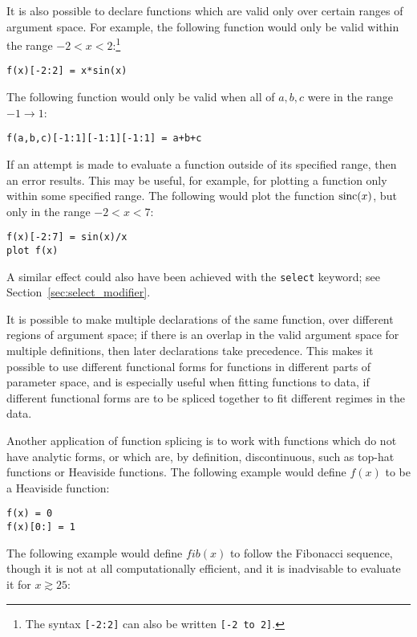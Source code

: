 \noindent It is also possible to declare functions which are valid only over
certain ranges of argument space. For example, the following function would
only be valid within the range $-2<x<2$:\footnote{The syntax {\tt [-2:2]} can
also be written {\tt [-2 to 2]}.}

\begin{verbatim}
f(x)[-2:2] = x*sin(x)
\end{verbatim}

\noindent The following function would only be valid when all of ${a,b,c}$ were
in the range $-1 \to 1$:

\begin{verbatim}
f(a,b,c)[-1:1][-1:1][-1:1] = a+b+c
\end{verbatim}

If an attempt is made to evaluate a function outside of its specified range,
then an error results. This may be useful, for example, for plotting a function
only within some specified range. The following would plot the function
${\rm sinc}(x)$, but only in the range $-2<x<7$:

\begin{verbatim}
f(x)[-2:7] = sin(x)/x
plot f(x)
\end{verbatim}

\noindent A similar effect could also have been achieved with the {\tt select}
keyword; see Section~\ref{sec:select_modifier}.

It is possible to make multiple declarations of the same function, over
different regions of argument space; if there is an overlap in the valid
argument space for multiple definitions, then later declarations take
precedence. This makes it possible to use different functional forms for
functions in different parts of parameter space, and is especially useful when
fitting functions to data, if different functional forms are to be spliced
together to fit different regimes in the data.

Another application of function splicing is to work with functions which do not
have analytic forms, or which are, by definition, discontinuous, such as
top-hat functions or Heaviside functions. The following example would define
$f(x)$ to be a Heaviside function:

\begin{verbatim}
f(x) = 0
f(x)[0:] = 1
\end{verbatim}

\noindent The following example would define $fib(x)$ to follow the Fibonacci
sequence, though it is not at all computationally efficient, and it is
inadvisable to evaluate it for $x\gtrsim25$:

